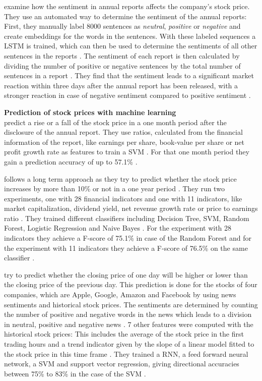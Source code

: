\cite{Azimi2019} examine how the sentiment in annual reports affects the company's stock price.
They use an automated way to determine the sentiment of the annual reports:
First, they manually label 8000 sentences as \textit{neutral}, \textit{positive} or \textit{negative} and create embeddings for the words in the sentences.
With these labeled sequences a \ac{LSTM} is trained, which can then be used to determine the sentiments of all other sentences in the reports \cite[p. 12]{Azimi2019}.
The sentiment of each report is then calculated by dividing the number of positive or negative sentences by the total number of sentences in a report \cite[p. 15]{Azimi2019}.
They find that the sentiment leads to a significant market reaction within three days after the annual report has been released, with a stronger reaction in case of negative sentiment compared to positive sentiment \cite[pp. 17-18]{Azimi2019}.

\textbf{Prediction of stock prices with machine learning} \\
\cite{Heo2016} predict a rise or a fall of the stock price in a one month period after the disclosure of the annual report.
They use ratios, calculated from the financial information of the report, like earnings per share, book-value per share or net profit growth rate as features to train a \ac{SVM} \cite[p. 61]{Heo2016}.
For that one month period they gain a prediction accuracy of up to 57.1\% \cite[p. 63]{Heo2016}.

\cite{Milosevic2016} follows a long term approach as they try to predict whether the stock price increases by more than 10\% or not in a one year period \cite[pp. 4-5]{Milosevic2016}.
They run two experiments, one with 28 financial indicators and one with 11 indicators, like market capitalization, dividend yield, net revenue growth rate or price to earnings ratio \cite[pp. 3-4]{Milosevic2016}.
They trained different classifiers including Decision Tree, \ac{SVM}, Random Forest, Logistic Regression and Naive Bayes \cite[p. 5]{Moukalled2019}.
For the experiment with 28 indicators they achieve a F-score of 75.1\% in case of the Random Forest and for the experiment with 11 indicators they achieve a F-score of 76.5\% on the same classifier \cite[p. 7]{Milosevic2016}.

\cite{Moukalled2019} try to predict whether the closing price of one day will be higher or lower than the closing price of the previous day.
This prediction is done for the stocks of four companies, which are Apple, Google, Amazon and Facebook by using news sentiments and historical stock prices.
The sentiments are determined by counting the number of positive and negative words in the news which leads to a division in neutral, positive and negative news \cite[p. 5]{Moukalled2019}.
7 other features were computed with the historical stock prices:
This includes the average of the stock price in the first trading hours and a trend indicator given by the slope of a linear model fitted to the stock price in this time frame \cite[p. 5]{Moukalled2019}.
They trained a \ac{RNN}, a feed forward neural network, a \ac{SVM} and support vector regression, giving directional accuracies between 75\% to 83\% in the case of the \ac{SVM} \cite[p. 8]{Moukalled2019}.

